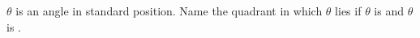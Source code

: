 $\theta$ is an angle in standard position. Name the quadrant in which $\theta$ lies if  $\theta$ is  and $\theta$ is .